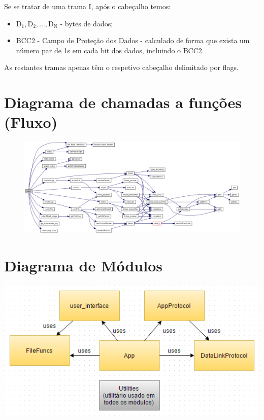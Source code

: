 \documentclass[11pt,a4paper,reqno]{report}
\numberwithin{equation}{section}
\begin{document}
\begin{appendices}
Se se tratar de uma trama I, após o cabeçalho temos:
\begin{itemize}
	\item $\text{D}_{\text{1}}, \text{D}_{\text{2}}, \ldots, \text{D}_{\text{N}}$ - bytes de dados;
	\item BCC2 - Campo de Proteção dos Dados - calculado de forma que exista um número par de 1s em cada bit dos dados, incluindo o BCC2.
\end{itemize}

As restantes tramas apenas têm o respetivo cabeçalho delimitado por flags.


\chapter{Diagrama de chamadas a funções (Fluxo)}
\label{flux}
\begin{figure}
\centering
\includegraphics[width=26cm]{_app_8c_a3c04138a5bfe5d72780bb7e82a18e627_cgraph.png}
\end{figure}


\chapter{Diagrama de Módulos}
\label{modulediagram}
\centering
\includegraphics[width=15cm]{rcom_module_diagram.png}

\end{appendices}
\end{document}
